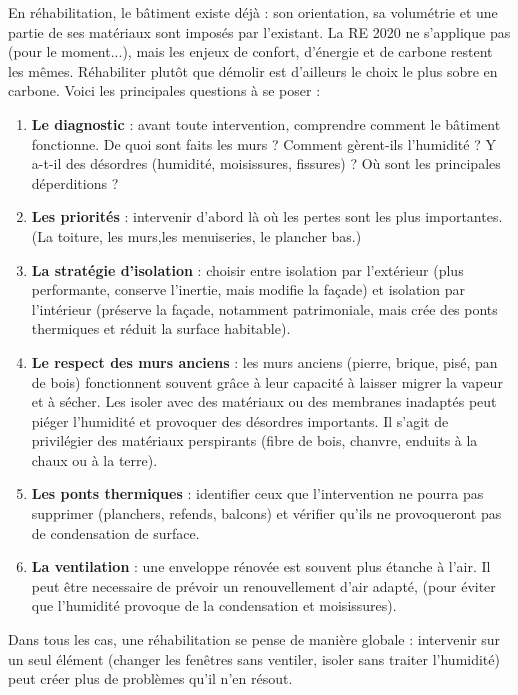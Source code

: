 En réhabilitation, le bâtiment existe déjà : son orientation, sa volumétrie et une partie de ses matériaux sont imposés par l'existant. La RE 2020 ne s'applique pas (pour le moment...), mais les enjeux de confort, d'énergie et de carbone restent les mêmes. Réhabiliter plutôt que démolir est d'ailleurs le choix le plus sobre en carbone. Voici les principales questions à se poser :

\begin{enumerate}
    \item \textbf{Le diagnostic} : avant toute intervention, comprendre comment le bâtiment fonctionne. De quoi sont faits les murs ? Comment gèrent-ils l'humidité ? Y a-t-il des désordres (humidité, moisissures, fissures) ? Où sont les principales déperditions ?
    \item \textbf{Les priorités} : intervenir d'abord là où les pertes sont les plus importantes. (La toiture, les murs,les menuiseries, le plancher bas.)
    \item \textbf{La stratégie d'isolation} : choisir entre isolation par l'extérieur (plus performante, conserve l'inertie, mais modifie la façade) et isolation par l'intérieur (préserve la façade, notamment patrimoniale, mais crée des ponts thermiques et réduit la surface habitable).
    \item \textbf{Le respect des murs anciens} : les murs anciens (pierre, brique, pisé, pan de bois) fonctionnent souvent grâce à leur capacité à laisser migrer la vapeur et à sécher. Les isoler avec des matériaux ou des membranes inadaptés peut piéger l'humidité et provoquer des désordres importants. Il s'agit de privilégier des matériaux perspirants (fibre de bois, chanvre, enduits à la chaux ou à la terre).
    \item \textbf{Les ponts thermiques} : identifier ceux que l'intervention ne pourra pas supprimer (planchers, refends, balcons) et vérifier qu'ils ne provoqueront pas de condensation de surface.
    \item \textbf{La ventilation} : une enveloppe rénovée est souvent plus étanche à l'air. Il peut être necessaire de prévoir un renouvellement d'air adapté, (pour éviter que l'humidité provoque de la condensation et moisissures).
    
\end{enumerate}

Dans tous les cas, une réhabilitation se pense de manière globale : intervenir sur un seul élément (changer les fenêtres sans ventiler, isoler sans traiter l'humidité) peut créer plus de problèmes qu'il n'en résout.
